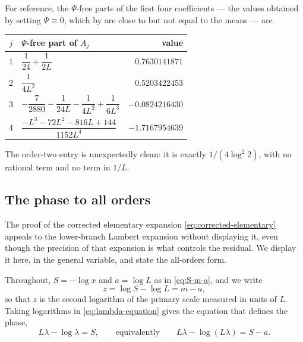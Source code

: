 \documentclass[11pt,oneside]{article}
\theoremstyle{definition}
\theoremstyle{remark}
\begin{document}
For reference, the $\Psi$-free parts of the first four coefficients --- the values obtained
by setting $\Psi\equiv0$, which by  are close to but not equal to the
means --- are
\begin{center}
\begin{tabular}{@{}clr@{}}
\toprule
$j$ & $\Psi$-free part of $A_j$ & value\\
\midrule
$1$ & $\dfrac1{24}+\dfrac1{2L}$ & $0.7630141871$\\[0.6em]
$2$ & $\dfrac1{4L^{2}}$ & $0.5203422453$\\[0.6em]
$3$ & $-\dfrac7{2880}-\dfrac1{24L}-\dfrac1{4L^{2}}+\dfrac1{6L^{3}}$ & $-0.0824216430$\\[0.6em]
$4$ & $\dfrac{-L^{3}-72L^{2}-816L+144}{1152L^{4}}$ & $-1.7167954639$\\
\bottomrule
\end{tabular}
\end{center}
The order-two entry is unexpectedly clean: it is exactly $1/(4\log^{2}2)$, with no rational
term and no term in $1/L$.


\subsection{The phase to all orders}
\label{subsec:as-phase-all-orders}

The proof of the corrected elementary expansion \eqref{eq:corrected-elementary} appeals to
the lower-branch Lambert expansion without displaying it, even though the precision of that
expansion is what controls the residual.  We display it here, in the general variable, and
state the all-orders form.

Throughout, $S=-\log x$ and $a=\log L$ as in \eqref{eq:S-m-a}, and we write
\begin{equation}
 z=\log S-\log L=m-a,                                     \label{eq:as-z-def}
\end{equation}
so that $z$ is the second logarithm of the primary scale measured in units of $L$.  Taking
logarithms in \eqref{eq:lambda-equation} gives the equation that defines the phase,
\begin{equation}
 L\lambda-\log\lambda=S,
 \qquad\text{equivalently}\qquad
 L\lambda-\log(L\lambda)=S-a.                             \label{eq:as-phase-equation}
\end{equation}
\end{document}
